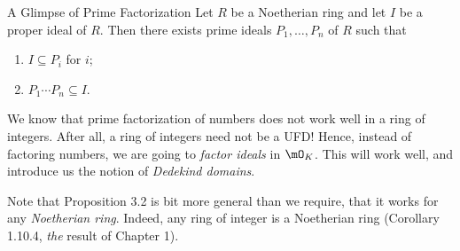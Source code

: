 \documentclass[pmath441]{subfiles}
\begin{document}
    \begin{prop}{A Glimpse of Prime Factorization}
        Let $R$ be a Noetherian ring and let $I$ be a proper ideal of $R$. Then there exists prime ideals $P_1,\ldots,P_n$ of $R$ such that
        \begin{enumerate}
            \item $I\subseteq P_i$ for $i$;
            \item $P_1\cdots P_n \subseteq I$.
        \end{enumerate}
    \end{prop}

    \rruleline

    \np We know that prime factorization of numbers does not work well in a ring of integers. After all, a ring of integers need not be a UFD! Hence, instead of factoring numbers, we are going to \textit{factor ideals} in $\mO_K$. This will work well, and introduce us the notion of \textit{Dedekind domains}. 
    
    Note that Proposition 3.2 is bit more general than we require, that it works for any \textit{Noetherian ring}. Indeed, any ring of integer is a Noetherian ring (Corollary 1.10.4, \textit{the} result of Chapter 1).
\end{document}
